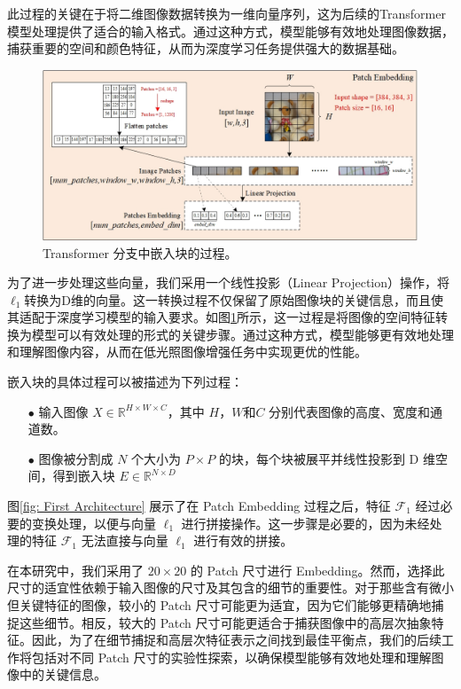 \documentclass[a4paper]{ctexart}
\begin{document}
	此过程的关键在于将二维图像数据转换为一维向量序列，这为后续的Transformer模型处理提供了适合的输入格式。通过这种方式，模型能够有效地处理图像数据，捕获重要的空间和颜色特征，从而为深度学习任务提供强大的数据基础。
	
	\begin{figure}[htb]
		\centering 
		\includegraphics[width=0.8\columnwidth]{picture/LLIE/My Architecture/Patch Embedding(ViT)}
		\caption{
			\label{fig: Patch Embedding(ViT)} 
			Transformer 分支中嵌入块的过程。
		}
	\end{figure}
	
	为了进一步处理这些向量，我们采用一个线性投影（Linear Projection）操作，将$\ell_1$转换为D维的向量。这一转换过程不仅保留了原始图像块的关键信息，而且使其适配于深度学习模型的输入要求。如图\ref{fig: Patch Embedding(ViT)}所示，这一过程是将图像的空间特征转换为模型可以有效处理的形式的关键步骤。通过这种方式，模型能够更有效地处理和理解图像内容，从而在低光照图像增强任务中实现更优的性能。
	
	嵌入块的具体过程可以被描述为下列过程：
	
	\begin{itemize}
		\item[$\bullet$] 
		输入图像 $X \in \mathbb{R}^{H \times W \times C}$，其中 $H$，$W$和$C$ 分别代表图像的高度、宽度和通道数。
		\item[$\bullet$]
		图像被分割成 $N$ 个大小为 $P \times P$ 的块，每个块被展平并线性投影到 D 维空间，得到嵌入块 $E \in \mathbb{R}^{N \times D}$
	\end{itemize}
	
	图\ref{fig: First Architecture} 展示了在 Patch Embedding 过程之后，特征 $\mathcal{F}_1$ 经过必要的变换处理，以便与向量 $\ell_1$ 进行拼接操作。这一步骤是必要的，因为未经处理的特征 $\mathcal{F}_1$ 无法直接与向量 $\ell_1$ 进行有效的拼接。
	
	在本研究中，我们采用了 $20 \times 20$ 的 Patch 尺寸进行 Embedding。然而，选择此尺寸的适宜性依赖于输入图像的尺寸及其包含的细节的重要性。对于那些含有微小但关键特征的图像，较小的 Patch 尺寸可能更为适宜，因为它们能够更精确地捕捉这些细节。相反，较大的 Patch 尺寸可能更适合于捕获图像中的高层次抽象特征。因此，为了在细节捕捉和高层次特征表示之间找到最佳平衡点，我们的后续工作将包括对不同 Patch 尺寸的实验性探索，以确保模型能够有效地处理和理解图像中的关键信息。
	
\end{document}
